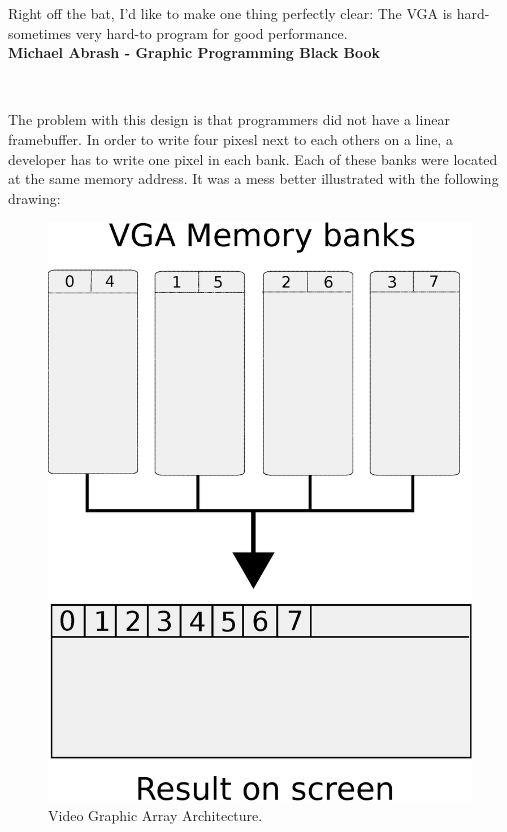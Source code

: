\documentclass[book.tex]{subfiles}
\begin{document}
 \begin{fancyquotes}
   Right off the bat, I'd like to make one thing perfectly clear: The VGA is hard-sometimes very hard-to program for good performance.
 \bigskip \\
\textbf{Michael Abrash - Graphic Programming Black Book}
 \end{fancyquotes}
 \\
\par
The problem with this design is that programmers did not have a linear framebuffer. In order to write four pixesl next to each others on a line, a developer has to write one pixel in each bank. Each of these banks were located at the same memory address. It was a mess better illustrated with the following drawing:\\
\par
\begin{figure}[H]
\centering
\includegraphics[width=\textwidth]{imgs/vga_ram_screen_layout.eps}
\caption{Video Graphic Array Architecture.}
\label{fig:vga_arch}
\end{figure}
\end{document}
